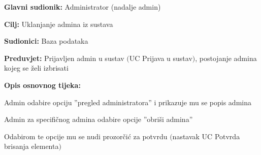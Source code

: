 					\noindent {}
					\begin{packed_item}
	
						\item \textbf{Glavni sudionik: } Administrator (nadalje admin)
						\item  \textbf{Cilj:} Uklanjanje admina iz sustava
						\item  \textbf{Sudionici:} Baza podataka
						\item  \textbf{Preduvjet:} Prijavljen admin u sustav $($UC Prijava u sustav$)$, postojanje
						admina kojeg se želi izbrisati
						\item  \textbf{Opis osnovnog tijeka:}
						
						\item[] \begin{packed_enum}
	
							\item Admin odabire opciju ”pregled administratora” i prikazuje mu se popis admina
							\item Admin za specifičnog admina odabire opcije ”obriši admina”
							\item Odabirom te opcije mu se nudi prozorčić za potvrdu $($nastavak UC Potvrda brisanja elementa$)$
						\end{packed_enum}
						
					\end{packed_item}

